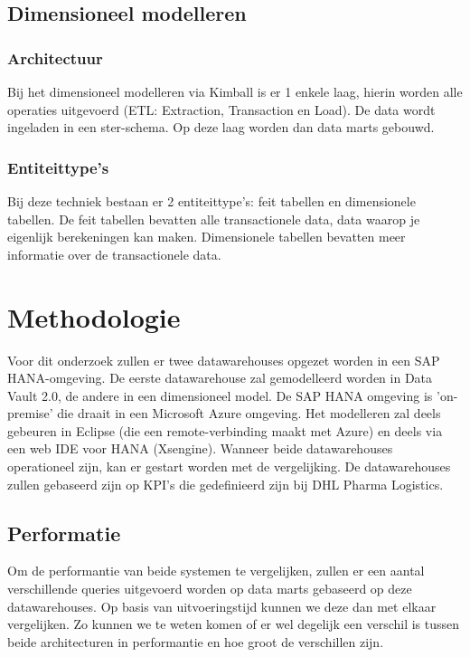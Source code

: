 \subsection{Dimensioneel modelleren}
\subsubsection{Architectuur}
Bij het dimensioneel modelleren via Kimball is er 1 enkele laag, hierin worden alle operaties uitgevoerd (ETL: Extraction, Transaction en Load). De data wordt ingeladen in een ster-schema. Op deze laag worden dan data marts gebouwd. \autocite{Jukic2006}

\subsubsection{Entiteittype's}
Bij deze techniek bestaan er 2 entiteittype's: feit tabellen en dimensionele tabellen. De feit tabellen bevatten alle transactionele data, data waarop je eigenlijk berekeningen kan maken. Dimensionele tabellen bevatten meer informatie over de transactionele data.



\section{Methodologie}
\label{sec:methodologie}
Voor dit onderzoek zullen er twee datawarehouses opgezet worden in een SAP HANA-omgeving. De eerste datawarehouse zal gemodelleerd worden in Data Vault 2.0, de andere in een dimensioneel model. De SAP HANA omgeving is 'on-premise' die draait in een Microsoft Azure omgeving. Het modelleren zal deels gebeuren in Eclipse (die een remote-verbinding maakt met Azure) en deels via een web IDE voor HANA (Xsengine). Wanneer beide datawarehouses operationeel zijn, kan er gestart worden met de vergelijking. De datawarehouses zullen gebaseerd zijn op KPI's die gedefinieerd zijn bij DHL Pharma Logistics.

\subsection{Performatie}
Om de performantie van beide systemen te vergelijken, zullen er een aantal verschillende queries uitgevoerd worden op data marts gebaseerd op deze datawarehouses. Op basis van uitvoeringstijd kunnen we deze dan met elkaar vergelijken. Zo kunnen we te weten komen of er wel degelijk een verschil is tussen beide architecturen in performantie en hoe groot de verschillen zijn. 

